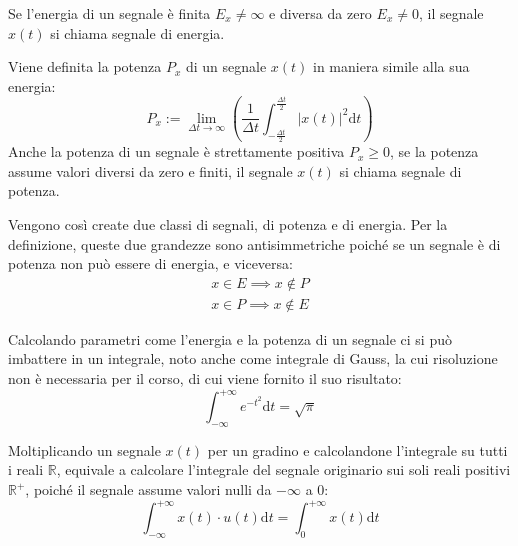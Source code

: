 \documentclass{article}
\newcommand{\df}{\mathrm{d}}
\newcommand{\intinf}{\displaystyle\int_{-\infty}^{+\infty}}
\newcommand{\intpinf}{\displaystyle\int_{0}^{+\infty}}
\numberwithin{equation}{subsection}
\begin{document}
Se l'energia di un segnale è finita $E_x\neq\infty$ e diversa da zero $E_x\neq0$, il segnale $x(t)$ si chiama segnale di energia.


Viene definita la potenza $P_x$ di un segnale $x(t)$ in maniera simile alla sua energia:
\begin{equation}
    P_x:=\lim_{\Delta t\to\infty}\displaystyle\left(\frac{1}{\Delta t}\int_{-\frac{\Delta t}{2}}^{\frac{\Delta t}{2}}|x(t)|^2\df t\right)
\end{equation}
Anche la potenza di un segnale è strettamente positiva $P_x\geq0$, se la potenza assume valori diversi da zero e finiti, il segnale $x(t)$ si chiama segnale di potenza. 

Vengono così create due classi di segnali, di potenza e di energia. Per la definizione, queste due grandezze sono antisimmetriche poiché se un segnale è di potenza non può 
essere di energia, e viceversa: 
\begin{gather*}
    x\in E\implies x\notin P\\
    x\in P\implies x\notin E
\end{gather*}

Calcolando parametri come l'energia e la potenza di un segnale ci si può imbattere in un integrale, noto anche come integrale di Gauss, la cui risoluzione non è necessaria 
per il corso, di cui viene fornito il suo risultato:
\begin{equation}
    \intinf e^{-t^2}\df t=\sqrt{\pi}
\end{equation}


Moltiplicando un segnale $x(t)$ per un gradino e calcolandone l'integrale su tutti i reali $\mathbb{R}$, equivale a calcolare l'integrale del segnale originario sui soli 
reali positivi $\mathbb{R}^+$, poiché il segnale assume valori nulli da $-\infty$ a $0$: 
\begin{equation*}
    \intinf x(t)\cdot u(t)\df t=\intpinf x(t)\df t
\end{equation*}
\end{document}
